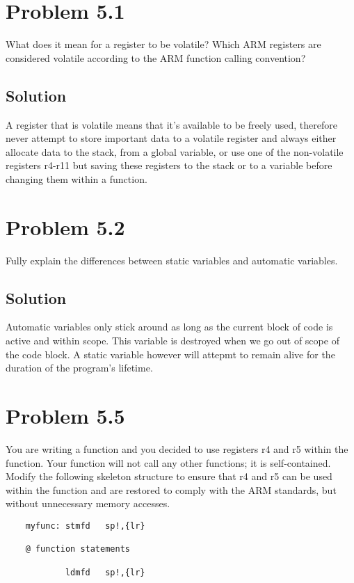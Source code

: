 \documentclass[letterpaper,11pt]{texMemo} %
\begin{document}
\maketitle %


\section*{Problem 5.1}
What does it mean for a register to be volatile? Which ARM registers are considered
volatile according to the ARM function calling convention?
\subsection*{Solution}
A register that is volatile means that it's available to be freely used, therefore
never attempt to store important data to a volatile register and always either
allocate data to the stack, from a global variable, or use one of the non-volatile
registers r4-r11 but saving these registers to the stack or to a variable before
changing them within a function.

\section*{Problem 5.2}
Fully explain the differences between static variables and automatic variables.
\subsection*{Solution}
Automatic variables only stick around as long as the current block of code is active
and within scope. This variable is destroyed when we go out of scope of the code block.
A static variable however will attepmt to remain alive for the duration of the program's
lifetime.

\newpage
\section*{Problem 5.5}
You are writing a function and you decided to use registers r4 and r5 within the 
function. Your function will not call any other functions; it is self-contained. 
Modify the following skeleton structure to ensure that r4 and r5 can be used within 
the function and are restored to comply with the ARM standards, but without unnecessary
memory accesses.
\begin{lstlisting}
    myfunc: stmfd   sp!,{lr}

    @ function statements

            ldmfd   sp!,{lr}
\end{lstlisting}
\end{document}

